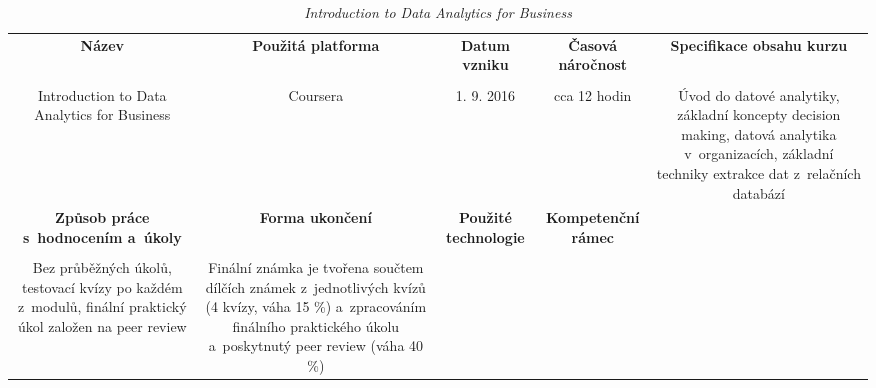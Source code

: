 \begin{landscape}

\begin{table}[htbp]

\renewcommand\thetable{2}

\caption{\textit{Introduction to Data Analytics for Business}}\label{tab1}

\footnotesize

{

\justifying

\begin{tabularx}{\linewidth}{CCCCC}

\toprule

\textbf{Název} &

\textbf{Použitá platforma} &

\textbf{Datum vzniku} &

\textbf{Časová náročnost} &
 
\textbf{Specifikace obsahu kurzu}

\\

\tabularnewline
\midrule

Introduction to Data Analytics for Business

&

Coursera

&

1. 9. 2016

&

cca 12 hodin

&

Úvod do datové analytiky, základní koncepty decision making, datová analytika v~organizacích, základní techniky extrakce dat z~relačních databází

\\
\toprule

\textbf{Způsob práce s~hodnocením a~úkoly} &

\textbf{Forma ukončení} &

\textbf{Použité technologie} &

\textbf{Kompetenční rámec} 

\\

\tabularnewline
\midrule

Bez průběžných úkolů, testovací kvízy po každém z~modulů, finální praktický úkol založen na peer review

&

Finální známka je tvořena součtem dílčích známek z~jednotlivých kvízů (4 kvízy, váha 15 \%) a~zpracováním finálního praktického úkolu a~poskytnutý peer review (váha 40 \%)


\end{tabularx}}
\end{table}
\end{landscape}
